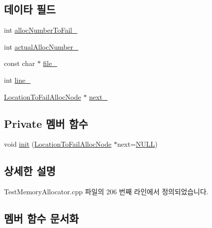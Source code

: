 \subsection*{데이타 필드}
\begin{DoxyCompactItemize}
\item 
int \hyperlink{class_location_to_fail_alloc_node_af455eff2e2a9cca9706893914495d60c}{alloc\+Number\+To\+Fail\+\_\+}
\item 
int \hyperlink{class_location_to_fail_alloc_node_adaf74e319a99b1e58c27cb006936108a}{actual\+Alloc\+Number\+\_\+}
\item 
const char $\ast$ \hyperlink{class_location_to_fail_alloc_node_a1f340748cdde8f8781fa62b4a3562190}{file\+\_\+}
\item 
int \hyperlink{class_location_to_fail_alloc_node_ac515e5f5602db49593f96316f1b5c054}{line\+\_\+}
\item 
\hyperlink{class_location_to_fail_alloc_node}{Location\+To\+Fail\+Alloc\+Node} $\ast$ \hyperlink{class_location_to_fail_alloc_node_a1d488315b4672de363b3dd44df78f2e8}{next\+\_\+}
\end{DoxyCompactItemize}
\subsection*{Private 멤버 함수}
\begin{DoxyCompactItemize}
\item 
void \hyperlink{class_location_to_fail_alloc_node_a19b60abc43cefd85d95ab2bb62b952d8}{init} (\hyperlink{class_location_to_fail_alloc_node}{Location\+To\+Fail\+Alloc\+Node} $\ast$next=\hyperlink{openavb__types__base__pub_8h_a070d2ce7b6bb7e5c05602aa8c308d0c4}{N\+U\+LL})
\end{DoxyCompactItemize}


\subsection{상세한 설명}


Test\+Memory\+Allocator.\+cpp 파일의 206 번째 라인에서 정의되었습니다.



\subsection{멤버 함수 문서화}
